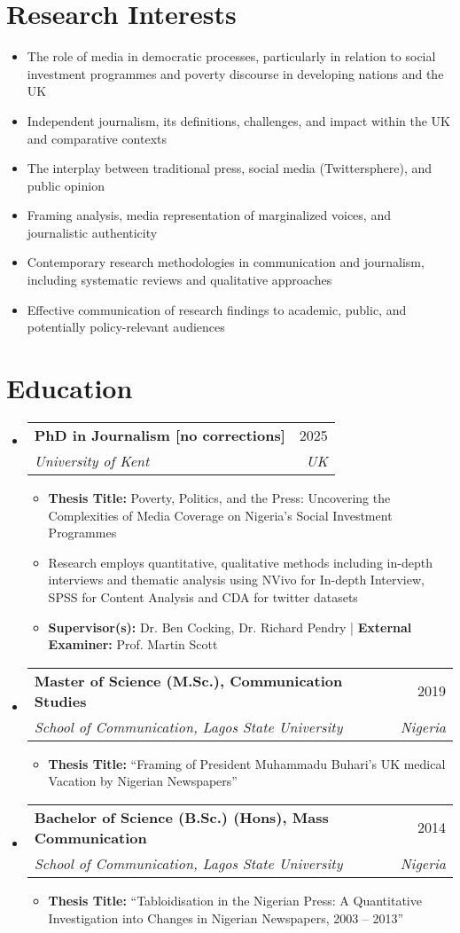 \documentclass[a4paper,11pt]{article}
\makeatletter
\newcommand{\resumeItem}[1]{
  \item\small{
    {#1 \vspace{-2pt}}
  }
}
\newcommand{\resumeSubheading}[4]{
  \vspace{-2pt}\item
    \begin{tabular*}{0.97\textwidth}[t]{l@{\extracolsep{\fill}}r}
      \textbf{#1} & #2 \\
      \textit{\small#3} & \textit{\small #4} \\
    \end{tabular*}\vspace{-7pt}
}
\newcommand{\resumeSubHeadingListStart}{\begin{itemize}[leftmargin=0.15in, label={}]}
\newcommand{\resumeSubHeadingListEnd}{\end{itemize}}
\newcommand{\resumeItemListStart}{\begin{itemize}}
\newcommand{\resumeItemListEnd}{\end{itemize}\vspace{-5pt}}
\makeatother
\begin{document}
\section{Research Interests}
    \resumeItemListStart
        \resumeItem{The role of media in democratic processes, particularly in relation to social investment programmes and poverty discourse in developing nations and the UK}
        \resumeItem{Independent journalism, its definitions, challenges, and impact within the UK and comparative contexts}
        \resumeItem{The interplay between traditional press, social media (Twittersphere), and public opinion}
        \resumeItem{Framing analysis, media representation of marginalized voices, and journalistic authenticity}
        \resumeItem{Contemporary research methodologies in communication and journalism, including systematic reviews and qualitative approaches}
        \resumeItem{Effective communication of research findings to academic, public, and potentially policy-relevant audiences}
    \resumeItemListEnd

\section{Education}
  \resumeSubHeadingListStart
    \resumeSubheading
      {PhD in Journalism [no corrections]}{2025}
      {University of Kent}{UK}
      \resumeItemListStart
        \resumeItem{\textbf{Thesis Title:} Poverty, Politics, and the Press: Uncovering the Complexities of Media Coverage on Nigeria's Social Investment Programmes}
        \resumeItem{Research employs quantitative, qualitative methods including in-depth interviews and thematic analysis using NVivo for In-depth Interview, SPSS for Content Analysis and CDA for twitter datasets}
        \resumeItem{\textbf{Supervisor(s):} Dr. Ben Cocking, Dr. Richard Pendry | \textbf{External Examiner:} Prof. Martin Scott}
      \resumeItemListEnd

    \resumeSubheading
      {Master of Science (M.Sc.), Communication Studies}{2019}
      {School of Communication, Lagos State University}{Nigeria}
      \resumeItemListStart
        \resumeItem{\textbf{Thesis Title:} ``Framing of President Muhammadu Buhari's UK medical Vacation by Nigerian Newspapers''}
      \resumeItemListEnd

    \resumeSubheading
      {Bachelor of Science (B.Sc.) (Hons), Mass Communication}{2014}
      {School of Communication, Lagos State University}{Nigeria}
      \resumeItemListStart
        \resumeItem{\textbf{Thesis Title:} ``Tabloidisation in the Nigerian Press: A Quantitative Investigation into Changes in Nigerian Newspapers, 2003 -- 2013''}
      \resumeItemListEnd
  \resumeSubHeadingListEnd
\end{document}

